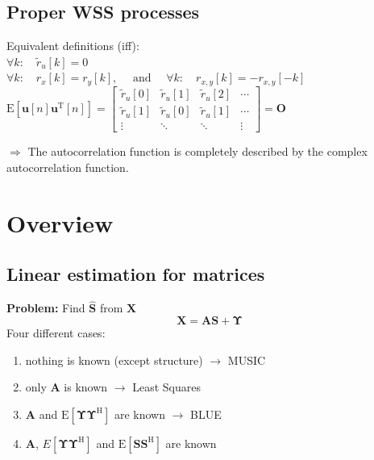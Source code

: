\documentclass[english]{latex4ei/latex4ei_sheet}
\begin{document}
\begin{sectionbox}
  \subsection{Proper WSS processes}
  Equivalent definitions (iff):\\
  $\forall k: \quad \tilde{r}_{u}[k]=0$\\
  $\forall k: \quad r_{x}[k]=r_{y}[k], \quad \text { and } \quad \forall k: \quad r_{x, y}[k]=-r_{x, y}[-k]$\\
  $\mathrm{E}\left[\boldsymbol{u}[n] \boldsymbol{u}^{\mathrm{T}}[n]\right]=\left[\begin{array}{cccc}
    \tilde{r}_{u}[0] & \tilde{r}_{u}[1] & \tilde{r}_{u}[2] & \cdots \\
    \tilde{r}_{u}[1] & \tilde{r}_{u}[0] & \tilde{r}_{u}[1] & \cdots \\
    \vdots & \ddots & \ddots & \vdots
    \end{array}\right]=\mathbf{O}$

  $\Rightarrow$ The autocorrelation function is completely described by the complex autocorrelation function.

\end{sectionbox}

\section{Overview}

  
  \begin{sectionbox}
    \subsection{Linear estimation for matrices}
    \textbf{Problem:} Find $\hat{\boldsymbol{S}}$ from $\boldsymbol{X}$
    $$\boldsymbol{X}=\boldsymbol{A} \boldsymbol{S}+\boldsymbol{\Upsilon}$$
    Four different cases: 
    \begin{enumerate}
      \item nothing is known (except structure) $\rightarrow$ MUSIC
      \item only $\boldsymbol{A}$ is known $\rightarrow$ Least Squares
      \item $\boldsymbol{A}$ and $\mathrm{E}\left[\boldsymbol{\Upsilon} \boldsymbol{\Upsilon}^{\mathrm{H}}\right]$ are known $\rightarrow$ BLUE
      \item $\boldsymbol{A}$, $E\left[\boldsymbol{\Upsilon} \boldsymbol{\Upsilon}^{\mathrm{H}}\right]$ and $\mathrm{E}\left[\boldsymbol{S} \boldsymbol{S}^{\mathrm{H}}\right]$ are known
    \end{enumerate}
  \end{sectionbox}
\end{document}
